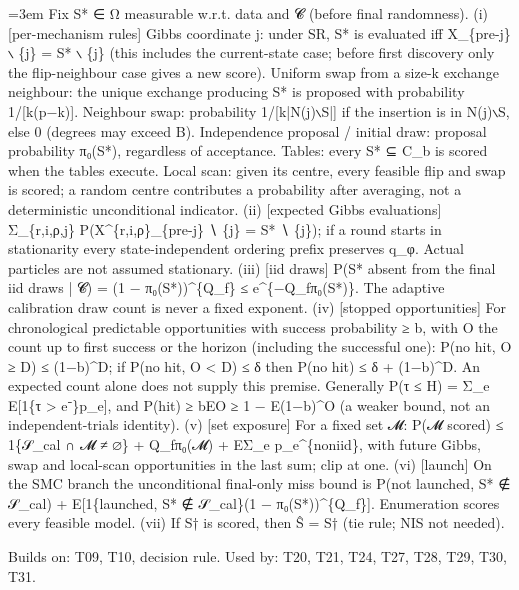 \documentclass[11pt]{report}
\newenvironment{mdblock}{\begingroup\mdfont\raggedright\setlength{\parindent}{0pt}\setlength{\parskip}{0.55em}\emergencystretch=3em}{\par\endgroup}
\newcommand{\mdhead}[2]{\par\vspace{0.7em}\noindent{\bfseries\ifcase#1\or\large\or\normalsize\or\normalsize\or\small\or\small\or\small\fi #2}\par\nopagebreak\vspace{0.1em}}
\begin{document}
\begin{mdblock}
Fix S* ∈ Ω measurable w.r.t. data and 𝓒 (before final randomness). (i) [per-mechanism rules] Gibbs coordinate j: under SR, S* is evaluated iff X\_\{pre-j\} ∖ \{j\} = S* ∖ \{j\} (this includes the current-state case; before first discovery only the flip-neighbour case gives a new score). Uniform swap from a size-k exchange neighbour: the unique exchange producing S* is proposed with probability 1/[k(p−k)]. Neighbour swap: probability 1/[k|N(j)∖S|] if the insertion is in N(j)∖S, else 0 (degrees may exceed B). Independence proposal / initial draw: proposal probability π₀(S*), regardless of acceptance. Tables: every S* ⊆ C\_b is scored when the tables execute. Local scan: given its centre, every feasible flip and swap is scored; a random centre contributes a probability after averaging, not a deterministic unconditional indicator. (ii) [expected Gibbs evaluations] Σ\_\{r,i,ρ,j\} P(X\textasciicircum{}\{r,i,ρ\}\_\{pre-j\} ∖ \{j\} = S* ∖ \{j\}); if a round starts in stationarity every state-independent ordering prefix preserves q\_φ. Actual particles are not assumed stationary. (iii) [iid draws] P(S* absent from the final iid draws | 𝓒) = (1 − π₀(S*))\textasciicircum{}\{Q\_f\} ≤ e\textasciicircum{}\{−Q\_fπ₀(S*)\}. The adaptive calibration draw count is never a fixed exponent. (iv) [stopped opportunities] For chronological predictable opportunities with success probability ≥ b, with O the count up to first success or the horizon (including the successful one): P(no hit, O ≥ D) ≤ (1−b)\textasciicircum{}D; if P(no hit, O < D) ≤ δ then P(no hit) ≤ δ + (1−b)\textasciicircum{}D. An expected count alone does not supply this premise. Generally P(τ ≤ H) = Σ\_e E[1\{τ > e⁻\}p\_e], and P(hit) ≥ bEO ≥ 1 − E(1−b)\textasciicircum{}O (a weaker bound, not an independent-trials identity). (v) [set exposure] For a fixed set 𝓜: P(𝓜 scored) ≤ 1\{𝒮\_cal ∩ 𝓜 ≠ ∅\} + Q\_fπ₀(𝓜) + EΣ\_e p\_e\textasciicircum{}\{noniid\}, with future Gibbs, swap and local-scan opportunities in the last sum; clip at one. (vi) [launch] On the SMC branch the unconditional final-only miss bound is P(not launched, S* ∉ 𝒮\_cal) + E[1\{launched, S* ∉ 𝒮\_cal\}(1 − π₀(S*))\textasciicircum{}\{Q\_f\}]. Enumeration scores every feasible model. (vii) If S† is scored, then Ŝ = S† (tie rule; NIS not needed).

\mdhead{2}{Dependencies}

Builds on: T09, T10, decision rule. Used by: T20, T21, T24, T27, T28, T29, T30, T31.

\mdhead{2}{Numerical evidence (provisional)}


\end{mdblock}
\end{document}
